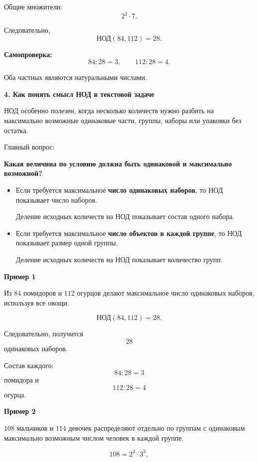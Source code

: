 \documentclass[a4paper,12pt]{article}
\newcommand{\subhead}[1]{%
    \vspace{0.25em}
    {\large\bfseries\textcolor{darkaccent}{#1}}\par
    \vspace{0.1em}
}
\begin{document}
Общие множители:
\[
2^2\cdot7.
\]

Следовательно,
\[
\text{НОД}(84,112)=28.
\]

\textbf{Самопроверка:}
\[
84:28=3,
\qquad
112:28=4.
\]

Оба частных являются натуральными числами.


\subhead{4. Как понять смысл НОД в текстовой задаче}

НОД особенно полезен,
когда несколько количеств нужно разбить
на максимально возможные одинаковые части,
группы, наборы или упаковки
без остатка.

Главный вопрос:

\begin{center}
\textbf{Какая величина по условию должна быть одинаковой
и максимально возможной?}
\end{center}

\begin{itemize}

\item
Если требуется максимальное
\textbf{число одинаковых наборов},
то НОД показывает число наборов.

Деление исходных количеств на НОД
показывает состав одного набора.

\item
Если требуется максимальное
\textbf{число объектов в каждой группе},
то НОД показывает размер одной группы.

Деление исходных количеств на НОД
показывает количество групп.

\end{itemize}

\textbf{Пример 1}

Из $84$ помидоров и $112$ огурцов
делают максимальное число одинаковых наборов,
используя все овощи.

\[
\text{НОД}(84,112)=28.
\]

Следовательно, получится
\[
28
\]
одинаковых наборов.

Состав каждого:
\[
84:28=3
\]
помидора и
\[
112:28=4
\]
огурца.

\textbf{Пример 2}

$108$ мальчиков и $114$ девочек
распределяют отдельно по группам
с одинаковым максимально возможным
числом человек в каждой группе.

\[
108=2^2\cdot3^3,
\]
\end{document}
